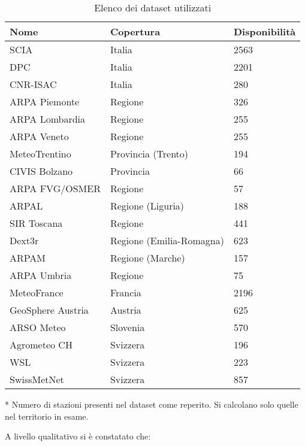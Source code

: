 \begin{table}[ht]
  \centering
  \begin{threeparttable}
    \caption{Elenco dei dataset utilizzati}\label{tab:quick-datasets}
    \begin{tabular}{l l l}
      \toprule
      Nome & Copertura & Disponibilità\tnote{*} \\
      \midrule
      SCIA & Italia & 2563 \\
      DPC & Italia & 2201 \\
      CNR-ISAC & Italia & 280 \\
      ARPA Piemonte & Regione & 326 \\
      ARPA Lombardia & Regione & 255 \\
      ARPA Veneto & Regione & 255 \\
      MeteoTrentino & Provincia (Trento) & 194 \\
      CIVIS Bolzano & Provincia & 66 \\
      ARPA FVG/OSMER & Regione & 57 \\
      ARPAL & Regione (Liguria) & 188 \\
      SIR Toscana & Regione & 441 \\
      Dext3r & Regione (Emilia-Romagna) & 623 \\
      ARPAM & Regione (Marche) & 157 \\
      ARPA Umbria & Regione & 75 \\
      MeteoFrance & Francia & 2196 \\
      GeoSphere Austria & Austria & 625 \\
      ARSO Meteo & Slovenia & 570 \\
      Agrometeo CH & Svizzera & 196 \\
      WSL & Svizzera & 223 \\
      SwissMetNet & Svizzera & 857 \\
      \bottomrule
    \end{tabular}
    \begin{tablenotes}
    \item[*] \small Numero di stazioni presenti nel dataset come reperito. Si calcolano solo quelle nel territorio in esame.
    \end{tablenotes}
  \end{threeparttable}
\end{table}

A livello qualitativo si è constatato che:

